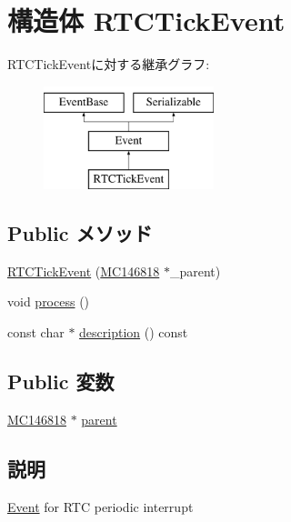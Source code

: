 \hypertarget{structMC146818_1_1RTCTickEvent}{
\section{構造体 RTCTickEvent}
\label{structMC146818_1_1RTCTickEvent}
}
RTCTickEventに対する継承グラフ:\begin{figure}[H]
\begin{center}
\leavevmode
\includegraphics[height=3cm]{structMC146818_1_1RTCTickEvent}
\end{center}
\end{figure}
\subsection*{Public メソッド}
\begin{DoxyCompactItemize}
\item 
\hyperlink{structMC146818_1_1RTCTickEvent_ad45ea1428a9c04a0c6a27e4338e6c6be}{RTCTickEvent} (\hyperlink{classMC146818}{MC146818} $\ast$\_\-parent)
\item 
void \hyperlink{structMC146818_1_1RTCTickEvent_a2e9c5136d19b1a95fc427e0852deab5c}{process} ()
\item 
const char $\ast$ \hyperlink{structMC146818_1_1RTCTickEvent_a5a14fe478e2393ff51f02e9b7be27e00}{description} () const 
\end{DoxyCompactItemize}
\subsection*{Public 変数}
\begin{DoxyCompactItemize}
\item 
\hyperlink{classMC146818}{MC146818} $\ast$ \hyperlink{structMC146818_1_1RTCTickEvent_a2013f7dfc8d6920600d61ad1f696a537}{parent}
\end{DoxyCompactItemize}


\subsection{説明}
\hyperlink{classEvent}{Event} for RTC periodic interrupt 

